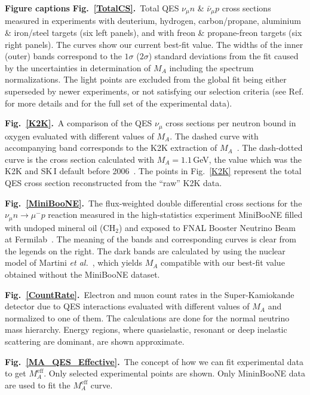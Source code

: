 \documentclass[review]{elsarticle}
\begin{document}
\newpage
{\bf Figure captions}
\vskip 1cm
{\bf Fig.~\ref{TotalCS}.}~Total QES $\nu_{\mu}n$ \& $\bar\nu_{\mu}p$ cross sections measured in experiments with deuterium, hydrogen, carbon/propane, aluminium \& iron/steel targets (six left panels), and with freon \& propane-freon targets (six right panels). The curves show our current best-fit value. The widths of the inner (outer) bands correspond to the $1\sigma$ ($2\sigma$) standard deviations from the fit caused by the uncertainties in determination of $M_A$ including the spectrum normalizations. The light points are excluded from the global fit being either superseded by newer experiments, or not satisfying our selection criteria (see Ref.\cite{Kuzmin:2007kr} for more details and for the full set of the experimental data).

{\bf Fig.~\ref{K2K}.}~A comparison of the QES $\nu_{\mu}$ cross sections per neutron bound in oxygen evaluated with different values of $M_A$. The dashed curve with accompanying band corresponds to the K2K extraction of $M_A$~\cite{Gran:2006jn}. The dash-dotted curve is the cross section calculated with $M_A=1.1$\,GeV, the value which was the K2K and SK\,I default before 2006~\cite{Gran:2006jn,Ashie:2005ik}. The points in Fig.~\ref{K2K} represent the total QES cross section reconstructed from the ``raw'' K2K data.

{\bf Fig.~\ref{MiniBooNE}.}~The flux-weighted double differential cross sections for the $\nu_{\mu}n\to\mu^-p$ reaction measured in the high-statistics experiment MiniBooNE filled with undoped mineral oil (CH$_2$) and exposed to FNAL Booster Neutrino Beam at Fermilab~\cite{AguilarArevalo:2010zc}. The meaning of the bands and corresponding curves is clear from the legends on the right. The dark bands are calculated by using the nuclear model of Martini \textit{et al.}~\cite{Martini:2011wp}, which yields $M_A$ compatible with our best-fit value obtained without the MiniBooNE dataset.

{\bf Fig.~\ref{CountRate}.}~Electron and muon count rates in the Super-Kamiokande detector due to QES interactions evaluated with different values of $M_A$ and normalized to one of them. The calculations are done for the normal neutrino mass hierarchy. Energy regions, where quasielastic, resonant or deep inelastic scattering are dominant, are shown approximate.

{\bf Fig.~\ref{MA_QES_Effective}.}~The concept of how we can fit experimental data to get $M_{A}^{\mathrm{eff}}$. Only selected experimental points are shown. Only MininBooNE data are used to fit the $M_{A}^{\mathrm{eff}}$ curve.
\end{document}
